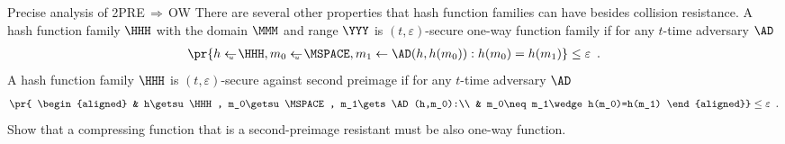 \documentclass{crypto-exercise}
\author{Sven Laur}
\begin{document}
\begin{exercise}{Precise analysis of 2PRE$\,\Rightarrow\,$OW}
There are several other properties that hash function families can have besides collision resistance. A hash function family $\HHH$  with the domain $\MMM$ and range $\YYY$ is $(t,\varepsilon)$-secure one-way function family if for any $t$-time adversary $\AD$
    \begin{align*}
      \pr{h\getsu\HHH, m_0\getsu\MSPACE, m_1\gets\AD(h,h(m_0)): h(m_0)=h(m_1)}\leq\varepsilon\enspace.
    \end{align*}
A hash function family $\HHH$ is $(t,\varepsilon)$-secure against second preimage if for any $t$-time adversary $\AD$
    \begin{align*}
      \pr{
        \begin{aligned}
         & h\getsu\HHH, m_0\getsu\MSPACE, m_1\gets \AD(h,m_0):\\
         & m_0\neq m_1\wedge h(m_0)=h(m_1)
        \end{aligned}}\leq\varepsilon\enspace.
    \end{align*}
Show that a compressing function that is a second-preimage resistant must be also one-way function. 
\end{exercise}
\end{document}
